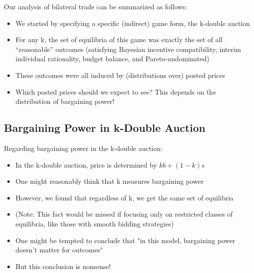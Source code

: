 \documentclass[11pt]{elegantbook_2}
\begin{document}
\begin{remark}
    Our analysis of bilateral trade can be summarized as follows:
    \begin{itemize}
        \item We started by specifying a specific (indirect) game form, the k-double auction
        \item For any k, the set of equilibria of this game was exactly the set of all ``reasonable'' outcomes (satisfying Bayesian incentive compatibility, interim individual rationality, budget balance, and Pareto-undominated)
        \item These outcomes were all induced by (distributions over) posted prices
        \item Which posted prices should we expect to see? This depends on the distribution of bargaining power!
    \end{itemize}
\end{remark}

\subsection{Bargaining Power in k-Double Auction}
\begin{remark}
    Regarding bargaining power in the k-double auction:
    \begin{itemize}
        \item In the k-double auction, price is determined by $kb+(1-k)s$
        \item One might reasonably think that k measures bargaining power
        \item However, we found that regardless of k, we get the same set of equilibria
        \item (Note: This fact would be missed if focusing only on restricted classes of equilibria, like those with smooth bidding strategies)
        \item One might be tempted to conclude that "in this model, bargaining power doesn't matter for outcomes"
        \item But this conclusion is nonsense!
    \end{itemize}
\end{remark}
\end{document}
